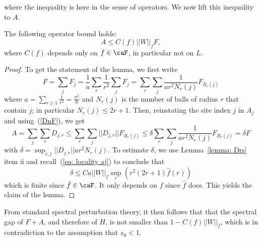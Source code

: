 where the inequality is here in the sense of operators. We now lift this inequality to $A$. 
\begin{lemma}
	The following operator bound holds:
	$$ A \leq  C(f)||W||_f  F, $$
	where $C(f)$ depends only on $f\in\caF$, in particular not on $L$.
\end{lemma} 
\begin{proof}
	To get the statement of the lemma, we first write
	$$
	F = \sum_j F_j = \frac{1}{a}\sum_{r}\frac{1}{r^2}\sum_j F_j
	= \sum_{r}\sum_j \frac{1}{a r^2 N_r(j)}F_{B_r(j)}
	$$
	where $a = \sum_{r\geq 1}\frac{1}{r^2} = \frac{\pi^2}{6}$ and $N_r(j)$ is the number of balls of radius $r$ that contain $j$; in particular $N_r(j)\leq 2r+1$. Then, reinstating the site index $j$ in $A_j$ and using~(\ref{DnF}), we get 
	$$
	A=\sum_j\sum_{r} D_{j,r}  \leq  \sum_{r}\sum_j ||D_{j,r}||  F_{B_r(j)} \leq \delta \sum_{r}\sum_j   \frac{1}{a r^2 N_r(j)} F_{B_r(j)} = \delta F
	$$
	with $\delta=  \sup_{r,j} ||D_{j,r}|| a r^2 N_r(j)$.
	To estimate $\delta$, we use Lemma~\ref{lemma: Drs} item ii and recall~(\ref{eq: locality aj}) to conclude that
	$$
	\delta \leq C a ||W||_f \sup_r \left(r^2(2r+1){\hat f(r)} \right) 
	$$
	which is finite since $\hat f \in\caF$. It only depends on $f$ since $\hat f$ does. This yields the claim of the lemma.
\end{proof}
From standard spectral perturbation theory, it then follows that that the spectral gap of $F+A$, and therefore of $H$, is not smaller than $1-C(f)||W||_f$, which is in contradiction to the assumption that $s_0<1$. 







